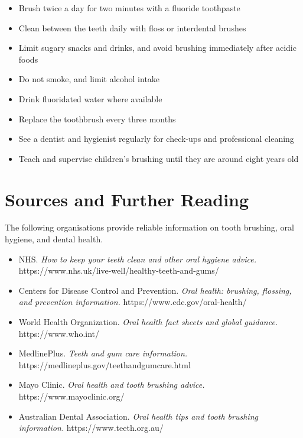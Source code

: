 \begin{itemize}
    \item Brush twice a day for two minutes with a fluoride toothpaste
    \item Clean between the teeth daily with floss or interdental brushes
    \item Limit sugary snacks and drinks, and avoid brushing immediately after acidic foods
    \item Do not smoke, and limit alcohol intake
    \item Drink fluoridated water where available
    \item Replace the toothbrush every three months
    \item See a dentist and hygienist regularly for check-ups and professional cleaning
    \item Teach and supervise children's brushing until they are around eight years old
\end{itemize}

\section*{Sources and Further Reading}
The following organisations provide reliable information on tooth brushing, oral hygiene, and dental health.

\begin{itemize}
    \item NHS. \textit{How to keep your teeth clean and other oral hygiene advice.} https://www.nhs.uk/live-well/healthy-teeth-and-gums/
    \item Centers for Disease Control and Prevention. \textit{Oral health: brushing, flossing, and prevention information.} https://www.cdc.gov/oral-health/
    \item World Health Organization. \textit{Oral health fact sheets and global guidance.} https://www.who.int/
    \item MedlinePlus. \textit{Teeth and gum care information.} https://medlineplus.gov/teethandgumcare.html
    \item Mayo Clinic. \textit{Oral health and tooth brushing advice.} https://www.mayoclinic.org/
    \item Australian Dental Association. \textit{Oral health tips and tooth brushing information.} https://www.teeth.org.au/
\end{itemize}
